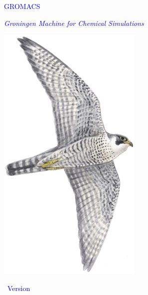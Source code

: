 \documentclass[11pt,a4paper,twoside]{gmxmanual}
\begin{document}

\addtolength{\oddsidemargin}{-5mm}

%
%
\pagestyle{empty}
\begin{center}

\textcolor{blue}{\fontsize{84}{96} \selectfont GROMACS}
\vspace{4mm}

\textcolor{blue}{\LARGE \em Groningen Machine for Chemical Simulations}
\vspace{4mm}

\includegraphics[height=5in]{plots/peregrine}
\vspace{4mm}







\vspace{4mm}

\textcolor{blue}{\fontsize{48}{56} \selectfont ~Version \gmxver~}



\end{center}
\vfill
\end{document}
